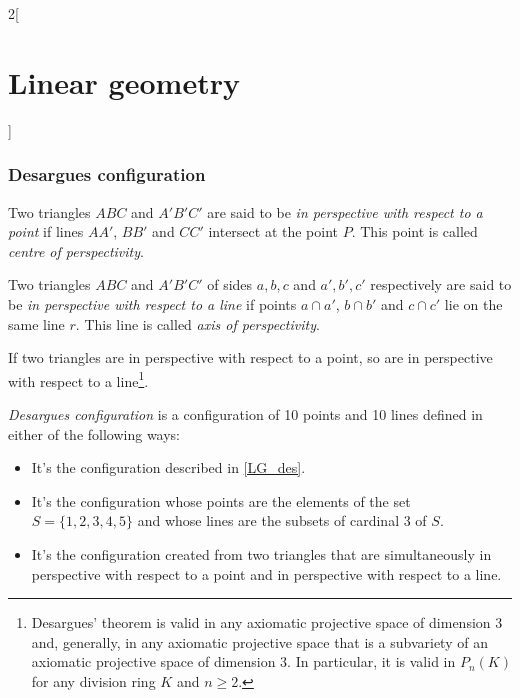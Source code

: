 \documentclass[../../../main.tex]{subfiles}
\begin{document}
\begin{multicols}{2}[\section{Linear geometry}]
  \subsubsection{Desargues configuration}
  \begin{definition}
    Two triangles $ABC$ and $A'B'C'$ are said to be \emph{in perspective with respect to a point} if lines $AA'$, $BB'$ and $CC'$ intersect at the point $P$. This point is called \emph{centre of perspectivity}.
  \end{definition}
  \begin{definition}
    Two triangles $ABC$ and $A'B'C'$ of sides $a,b,c$ and $a',b',c'$ respectively are said to be \emph{in perspective with respect to a line} if points $a\cap a'$, $b\cap b'$ and $c\cap c'$ lie on the same line $r$. This line is called \emph{axis of perspectivity}.
  \end{definition}
  \begin{theorem}
    If two triangles are in perspective with respect to a point, so are in perspective with respect to a line\footnote{Desargues' theorem is valid in any axiomatic projective space of dimension 3 and, generally, in any axiomatic projective space that is a subvariety of an axiomatic projective space of dimension 3. In particular, it is valid in $P_n(K)$ for any division ring $K$ and $n\geq2$.}.
  \end{theorem}
  \begin{definition}
    \emph{Desargues configuration} is a configuration of 10 points and 10 lines defined in either of the following ways:
    \begin{itemize}
      \item It's the configuration described in \cref{LG_des}.
            \begin{center}
              \begin{minipage}{\linewidth}
                \centering
                
                \label{LG_des}
              \end{minipage}
            \end{center}
      \item It's the configuration whose points are the elements of the set $S=\{1,2,3,4,5\}$ and whose lines are the subsets of cardinal 3 of $S$.
      \item It's the configuration created from two triangles that are simultaneously in perspective with respect to a point and in perspective with respect to a line.

\end{itemize}
\end{definition}
\end{multicols}
\end{document}
